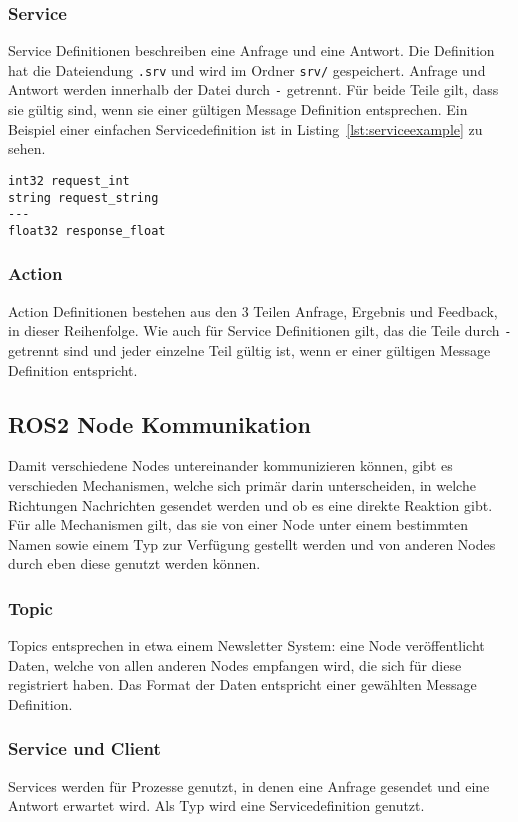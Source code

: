 \subsubsection{Service}
Service Definitionen beschreiben eine Anfrage und eine Antwort.
Die Definition hat die Dateiendung \verb|.srv| und wird im Ordner \verb|srv/| gespeichert.
Anfrage und Antwort werden innerhalb der Datei durch \verb|-| getrennt.
Für beide Teile gilt, dass sie gültig sind, wenn sie einer gültigen Message Definition entsprechen.
Ein Beispiel einer einfachen Servicedefinition ist in Listing~\ref{lst:serviceexample} zu sehen.\\
\begin{minipage}{\linewidth}%
\begin{lstlisting}[caption={Beispiel einer Service Definition}, label={lst:serviceexample}]
int32 request_int
string request_string
---
float32 response_float
\end{lstlisting}
\end{minipage}
\subsubsection{Action}
Action Definitionen bestehen aus den 3 Teilen Anfrage, Ergebnis und Feedback, in dieser Reihenfolge.
Wie auch für Service Definitionen gilt, das die Teile durch \verb|-| getrennt sind und jeder einzelne Teil gültig ist, wenn er einer gültigen Message Definition entspricht.
\subsection{ROS2 Node Kommunikation}{\label{rosnodecomm}}
Damit verschiedene Nodes untereinander kommunizieren können, gibt es verschieden Mechanismen, welche sich primär darin unterscheiden, in welche Richtungen Nachrichten gesendet werden und ob es eine direkte Reaktion gibt.
Für alle Mechanismen gilt, das sie von einer Node unter einem bestimmten Namen sowie einem Typ zur Verfügung gestellt werden und von anderen Nodes durch eben diese genutzt werden können.
\subsubsection{Topic}
Topics entsprechen in etwa einem Newsletter System: eine Node veröffentlicht Daten, welche von allen anderen Nodes empfangen wird, die sich für diese registriert haben.
Das Format der Daten entspricht einer gewählten Message Definition.
\subsubsection{Service und Client}
Services werden für Prozesse genutzt, in denen eine Anfrage gesendet und eine Antwort erwartet wird.
Als Typ wird eine Servicedefinition genutzt.
